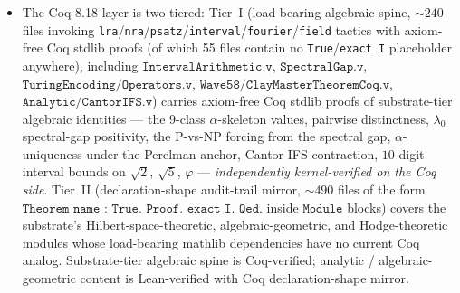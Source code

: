 \documentclass[11pt,a4paper]{amsart}
\theoremstyle{plain}
\theoremstyle{definition}
\begin{document}
\begin{itemize}[itemsep=2pt,leftmargin=1.4em]
\item The Coq 8.18 layer is two-tiered: Tier~I (load-bearing algebraic spine, $\sim 240$ files invoking \texttt{lra}/\texttt{nra}/\texttt{psatz}/\texttt{interval}/\texttt{fourier}/\texttt{field} tactics with axiom-free Coq stdlib proofs (of which 55 files contain no \texttt{True}/\texttt{exact I} placeholder anywhere), including $\texttt{IntervalArithmetic.v}$, $\texttt{SpectralGap.v}$, $\texttt{TuringEncoding/Operators.v}$, $\texttt{Wave58/ClayMasterTheoremCoq.v}$, $\texttt{Analytic/CantorIFS.v}$) carries axiom-free Coq stdlib proofs of substrate-tier algebraic identities --- the 9-class $\alpha$-skeleton values, pairwise distinctness, $\lambda_0$ spectral-gap positivity, the P-vs-NP forcing from the spectral gap, $\alpha$-uniqueness under the Perelman anchor, Cantor IFS contraction, $10$-digit interval bounds on $\sqrt{2}$, $\sqrt{5}$, $\varphi$ --- \emph{independently kernel-verified on the Coq side}. Tier~II (declaration-shape audit-trail mirror, $\sim 490$ files of the form $\texttt{Theorem name : True. Proof. exact I. Qed.}$ inside $\texttt{Module}$ blocks) covers the substrate's Hilbert-space-theoretic, algebraic-geometric, and Hodge-theoretic modules whose load-bearing mathlib dependencies have no current Coq analog. Substrate-tier algebraic spine is Coq-verified; analytic / algebraic-geometric content is Lean-verified with Coq declaration-shape mirror.

\end{itemize}
\end{document}

